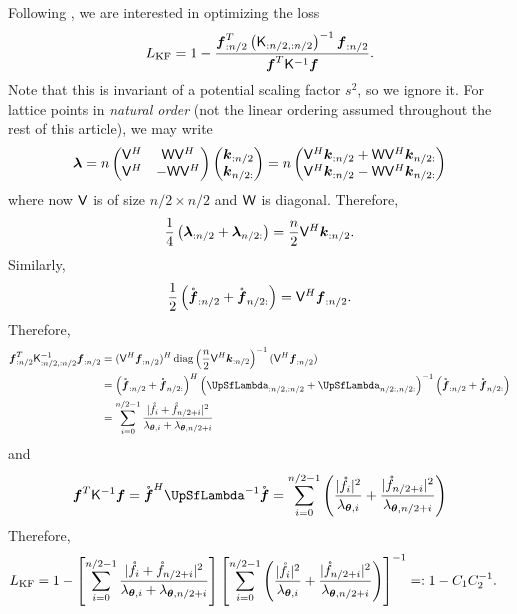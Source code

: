 \documentclass{amsart}
\newcommand{\rvf}{\mathring{\vf}}
\begin{document}
Following \cite{chen2021consistency}, we are interested in optimizing the loss 
$$L_\mathrm{KF} = 1- \frac{\boldsymbol{f}_{:n/2}^T \left(\mathsf{K}_{:n/2,:n/2}\right)^{-1} \boldsymbol{f}_{:n/2}}{\boldsymbol{f}^T \mathsf{K}^{-1} \boldsymbol{f}}.$$
Note that this is invariant of a potential scaling factor $s^2$, so we ignore it. For lattice points in \emph{natural order} (not the linear ordering assumed throughout the rest of this article), we may write 
$$\boldsymbol{\lambda} = n \begin{pmatrix} \mathsf{V}^H & \mathsf{W} \mathsf{V}^H \\ \mathsf{V}^H & - \mathsf{W} \mathsf{V}^H \end{pmatrix} \begin{pmatrix} \boldsymbol{k}_{:n/2} \\ \boldsymbol{k}_{n/2:} \end{pmatrix} = n \begin{pmatrix} \mathsf{V}^H \boldsymbol{k}_{:n/2} + \mathsf{W} \mathsf{V}^H \boldsymbol{k}_{n/2:} \\ \mathsf{V}^H \boldsymbol{k}_{:n/2} - \mathsf{W} \mathsf{V}^H \boldsymbol{k}_{n/2:} \end{pmatrix}$$
where now $\mathsf{V}$ is of size $n/2 \times n/2$ and $\mathsf{W}$ is diagonal. Therefore, 
$$\frac{1}{4} \left(\boldsymbol{\lambda}_{:n/2} + \boldsymbol{\lambda}_{n/2:}\right) = \frac{n}{2} \mathsf{V}^H \boldsymbol{k}_{:n/2}.$$
Similarly, 
$$\frac{1}{2} \left(\rvf_{:n/2} + \rvf_{n/2:}\right) = \mV^H \vf_{:n/2}.$$
Therefore,
\begin{align*}
    \vf_{:n/2}^T \mK_{:n/2,:n/2}^{-1} \vf_{:n/2} 
    &= (\mV^H \vf_{:n/2})^H \diag\left(\frac{n}{2}\mV^H \vk_{:n/2}\right)^{-1} (\mV^H \vf_{:n/2}) \\
    &= \left(\rvf_{:n/2}+\rvf_{n/2:}\right)^H \left(\mLambda_{:n/2,:n/2}+\mLambda_{n/2:,n/2:}\right)^{-1}\left(\rvf_{:n/2}+\rvf_{n/2:}\right) \\
    &= \sum_{i=0}^{n/2-1} \frac{\lvert \rf_i + \rf_{n/2+i} \rvert^2}{\lambda_{\vtheta,i} + \lambda_{\vtheta,n/2+i}}
\end{align*}
and 
$$\vf^T \mK^{-1} \vf = \rvf^H \mLambda^{-1} \rvf = \sum_{i=0}^{n/2-1} \left(\frac{\lvert \rf_i \rvert^2}{\lambda_{\vtheta,i}} + \frac{\lvert \rf_{n/2+i} \rvert^2}{\lambda_{\vtheta,n/2+i}} \right)$$
Therefore, 
\begin{align*}
    L_\mathrm{KF} &= 1 - \left[\sum_{i=0}^{n/2-1} \frac{\lvert \mathring{f}_i + \mathring{f}_{n/2+i} \rvert^2}{\lambda_{\boldsymbol{\theta},i} + \lambda_{\boldsymbol{\theta},n/2+i}}\right] \left[\sum_{i=0}^{n/2-1} \left(\frac{\lvert \mathring{f}_i \rvert^2}{\lambda_{\boldsymbol{\theta},i}} + \frac{\lvert \mathring{f}_{n/2+i} \rvert^2}{\lambda_{\boldsymbol{\theta},n/2+i}} \right)\right]^{-1} =: 1-C_1 C_2^{-1}.
\end{align*}
\end{document}
